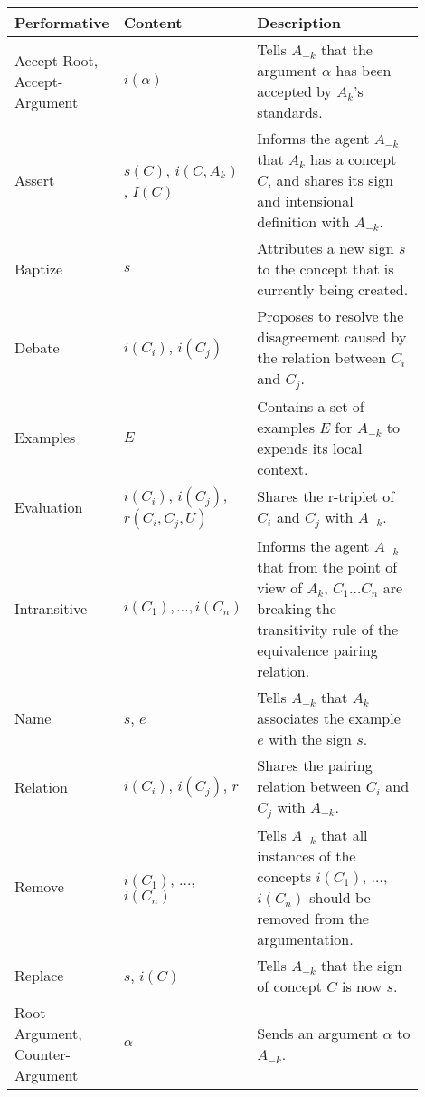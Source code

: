 \begin{table}
    \centering
    \begin{tabular}[t]{| >{\raggedright\arraybackslash}m{0.2\linewidth} | >{\raggedright\arraybackslash}m{0.25\linewidth}  | >{\raggedright\arraybackslash}m{0.45\linewidth} | } 
         \hline
         Performative & Content & Description \\
        \hline
        \hline
        Accept-Root, Accept-Argument & $i(\alpha)$ & Tells $A_{-k}$ that the argument $\alpha$ has been accepted by $A_{k}$'s standards.\\
        \hline
        Assert & $s(C)$, $i(C,A_{k})$, $I(C)$ & Informs the agent $A_{-k}$ that $A_{k}$ has a concept $C$, and shares its sign and intensional definition with $A_{-k}$.\\
        \hline
        Baptize & $s$ & Attributes a new sign $s$ to the concept that is currently being created. \\
        \hline
        Debate & $i(C_{i})$, $i(C_{j})$ & Proposes to resolve the disagreement caused by the relation between $C_{i}$ and $C_{j}$.\\
        \hline
        Examples & $E$ & Contains a set of examples $E$ for $A_{-k}$ to expends its local context.\\
        \hline
        Evaluation & $i(C_{i})$, $i(C_{j})$, $r(C_{i}, C_{j}, U)$ & Shares the r-triplet of $C_{i}$ and $C_{j}$ with $A_{-k}$.\\
        \hline
        Intransitive & $i(C_{1}), \ldots, i(C_{n})$ & Informs the agent $A_{-k}$ that from the point of view of $A_{k}$, $C_{1} \ldots C_{n}$ are breaking the transitivity rule of the equivalence pairing relation.\\
        \hline
        Name & $s$, $e$ & Tells $A_{-k}$ that $A_{k}$ associates the example $e$ with the sign $s$.\\
        \hline
        Relation & $i(C_{i})$, $i(C_{j})$, $r$ & Shares the pairing relation between $C_{i}$ and $C_{j}$ with $A_{-k}$.\\
        \hline
        Remove & $i(C_{1})$, $\ldots$, $i(C_{n})$ & Tells $A_{-k}$ that all instances of the concepts $i(C_{1})$, $\ldots$, $i(C_{n})$ should be removed from the argumentation.\\
        \hline
        Replace & $s$, $i(C)$ & Tells $A_{-k}$ that the sign of concept $C$ is now $s$.\\
        \hline
        Root-Argument, Counter-Argument & $\alpha$ & Sends an argument $\alpha$ to $A_{-k}$.\\

\end{tabular}
\end{table}
